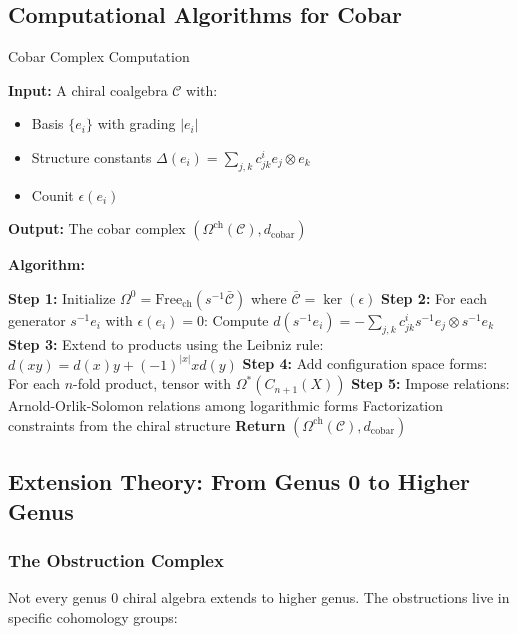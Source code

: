 \subsection{Computational Algorithms for Cobar}

\begin{algorithm}[htbp]
\caption{Cobar Complex Computation}
\textbf{Input:} A chiral coalgebra $\mathcal{C}$ with:
\begin{itemize}
\item Basis $\{e_i\}$ with grading $|e_i|$
\item Structure constants $\Delta(e_i) = \sum_{j,k} c_{jk}^i e_j \otimes e_k$
\item Counit $\epsilon(e_i)$
\end{itemize}

\textbf{Output:} The cobar complex $(\Omega^{\text{ch}}(\mathcal{C}), d_{\text{cobar}})$

\textbf{Algorithm:}
\begin{algorithmic}
\State \textbf{Step 1:} Initialize $\Omega^0 = \text{Free}_{\text{ch}}(s^{-1}\bar{\mathcal{C}})$ where $\bar{\mathcal{C}} = \ker(\epsilon)$
\State \textbf{Step 2:} For each generator $s^{-1}e_i$ with $\epsilon(e_i) = 0$:
\State \quad Compute $d(s^{-1}e_i) = -\sum_{j,k} c_{jk}^i s^{-1}e_j \otimes s^{-1}e_k$
\State \textbf{Step 3:} Extend to products using the Leibniz rule:
\State \quad $d(xy) = d(x)y + (-1)^{|x|}xd(y)$
\State \textbf{Step 4:} Add configuration space forms:
\State \quad For each $n$-fold product, tensor with $\Omega^*(C_{n+1}(X))$
\State \textbf{Step 5:} Impose relations:
\State \quad Arnold-Orlik-Solomon relations among logarithmic forms
\State \quad Factorization constraints from the chiral structure
\State \textbf{Return} $(\Omega^{\text{ch}}(\mathcal{C}), d_{\text{cobar}})$
\end{algorithmic}
\end{algorithm}

\subsection{Extension Theory: From Genus 0 to Higher Genus}

\subsubsection{The Obstruction Complex}

Not every genus 0 chiral algebra extends to higher genus. The obstructions live in specific cohomology groups:


